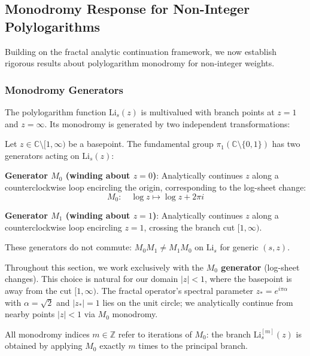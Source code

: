 \subsection{Monodromy Response for Non-Integer Polylogarithms}

Building on the fractal analytic continuation framework, we now establish rigorous results about polylogarithm monodromy for non-integer weights.

\subsubsection{Monodromy Generators}

The polylogarithm function $\mathrm{Li}_s(z)$ is multivalued with branch points at $z=1$ and $z=\infty$. Its monodromy is generated by two independent transformations:

\begin{definition}\label{def:monodromy-generators}
Let $z \in \mathbb{C}\setminus[1,\infty)$ be a basepoint. The fundamental group $\pi_1(\mathbb{C}\setminus\{0,1\})$ has two generators acting on $\mathrm{Li}_s(z)$:

\textbf{Generator $M_0$ (winding about $z=0$)}: Analytically continues $z$ along a counterclockwise loop encircling the origin, corresponding to the log-sheet change:
\begin{equation}
M_0: \quad \log z \mapsto \log z + 2\pi i
\end{equation}

\textbf{Generator $M_1$ (winding about $z=1$)}: Analytically continues $z$ along a counterclockwise loop encircling $z=1$, crossing the branch cut $[1,\infty)$.

These generators do not commute: $M_0 M_1 \neq M_1 M_0$ on $\mathrm{Li}_s$ for generic $(s,z)$.
\end{definition}

\begin{remark}
Throughout this section, we work exclusively with the \textbf{$M_0$ generator} (log-sheet changes). This choice is natural for our domain $|z| < 1$, where the basepoint is away from the cut $[1,\infty)$. The fractal operator's spectral parameter $z_* = e^{i\pi\alpha}$ with $\alpha = \sqrt{2}$ and $|z_*| = 1$ lies on the unit circle; we analytically continue from nearby points $|z| < 1$ via $M_0$ monodromy.

All monodromy indices $m \in \mathbb{Z}$ refer to iterations of $M_0$: the branch $\mathrm{Li}_s^{[m]}(z)$ is obtained by applying $M_0$ exactly $m$ times to the principal branch.
\end{remark}

